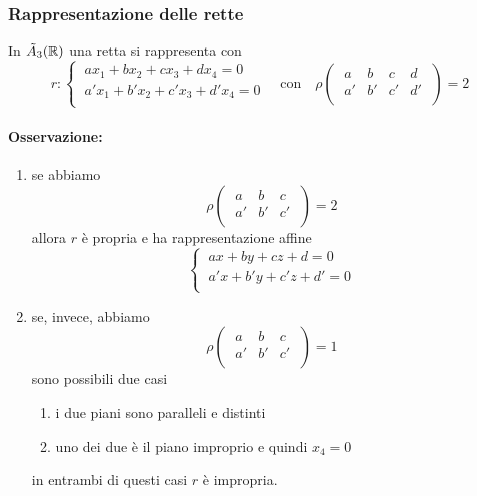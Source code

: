 \subsubsection{Rappresentazione delle rette}
In \(\tilde{A}_{3}(\RR ) \) una retta si rappresenta con \[
r:
\begin{cases}
    \ ax_1 + bx_2+ cx_3 + dx_4 = 0 \\
    \ a'x_1 + b'x_2+ c'x_3 + d'x_4 = 0 \\
\end{cases} \quad \text{con} \quad \rho
\left( \; \begin{matrix}
    a & b & c & d \\
    a' & b' & c' & d' \\
\end{matrix} \; \right) = 2
\] 
\paragraph{Osservazione:} 
\begin{enumerate}
    \item se abbiamo \[
    \rho
\left( \; \begin{matrix}
    a & b & c \\
    a' & b' & c' \\
\end{matrix} \; \right) = 2     
    \] allora \(r\) è propria e ha rappresentazione affine \[
\begin{cases}
    \ ax + by + cz + d = 0 \\
    \ a'x + b'y + c'z + d' = 0 \\
\end{cases}
    \]
\item se, invece, abbiamo \[
    \rho
\left( \; \begin{matrix}
    a & b & c \\
    a' & b' & c' \\
\end{matrix} \; \right) = 1     
    \] sono possibili due casi
    \begin{enumerate}
        \item i due piani sono paralleli e distinti
        \item uno dei due è il piano improprio e quindi \(x_4 = 0\)
    \end{enumerate}
    in entrambi di questi casi \(r\) è impropria.
\end{enumerate} 

